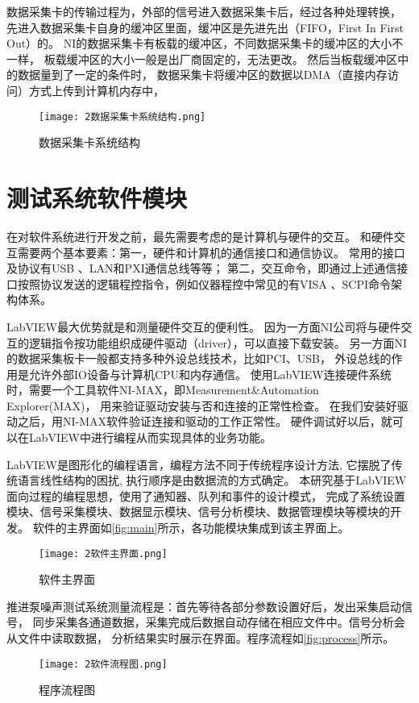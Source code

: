 数据采集卡的传输过程为，外部的信号进入数据采集卡后，经过各种处理转换，
先进入数据采集卡自身的缓冲区里面，缓冲区是先进先出（FIFO，First In First Out）的。
NI的数据采集卡有板载的缓冲区，不同数据采集卡的缓冲区的大小不一样，
板载缓冲区的大小一般是出厂商固定的，无法更改。
然后当板载缓冲区中的数据量到了一定的条件时，
数据采集卡将缓冲区的数据以DMA（直接内存访问）方式上传到计算机内存中，
\begin{figure}[htbp]
    \centering
    \texttt{[image: 2数据采集卡系统结构.png]}
    \caption{\label{fig:acquire}数据采集卡系统结构}
\end{figure}

\section{测试系统软件模块}
在对软件系统进行开发之前，最先需要考虑的是计算机与硬件的交互。
和硬件交互需要两个基本要素：第一，硬件和计算机的通信接口和通信协议。
常用的接口及协议有USB 、LAN和PXI通信总线等等；
第二，交互命令，即通过上述通信接口按照协议发送的逻辑程控指令，例如仪器程控中常见的有VISA 、SCPI命令架构体系。

LabVIEW最大优势就是和测量硬件交互的便利性。
因为一方面NI公司将与硬件交互的逻辑指令按功能组织成硬件驱动（driver），可以直接下载安装。
另一方面NI的数据采集板卡一般都支持多种外设总线技术，比如PCI、USB，
外设总线的作用是允许外部IO设备与计算机CPU和内存通信。
使用LabVIEW连接硬件系统时，需要一个工具软件NI-MAX，即Measurement\&Automation Explorer(MAX)，
用来验证驱动安装与否和连接的正常性检查。
在我们安装好驱动之后，用NI-MAX软件验证连接和驱动的工作正常性。
硬件调试好以后，就可以在LabVIEW中进行编程从而实现具体的业务功能。

LabVIEW是图形化的编程语言，编程方法不同于传统程序设计方法, 它摆脱了传统语言线性结构的困扰, 
执行顺序是由数据流的方式确定。
本研究基于LabVIEW面向过程的编程思想，使用了通知器、队列和事件的设计模式，
完成了系统设置模块、信号采集模块、数据显示模块、信号分析模块、数据管理模块等模块的开发。
软件的主界面如\autoref{fig:main}所示，各功能模块集成到该主界面上。
\begin{figure}[htbp]
    \centering
    \texttt{[image: 2软件主界面.png]}
    \caption{\label{fig:main}软件主界面}
\end{figure}

推进泵噪声测试系统测量流程是：首先等待各部分参数设置好后，发出采集启动信号，
同步采集各通道数据，采集完成后数据自动存储在相应文件中。信号分析会从文件中读取数据，
分析结果实时展示在界面。程序流程如\autoref{fig:process}所示。
\begin{figure}[htbp]
    \centering
    \texttt{[image: 2软件流程图.png]}
    \caption{\label{fig:process}程序流程图}
\end{figure}

